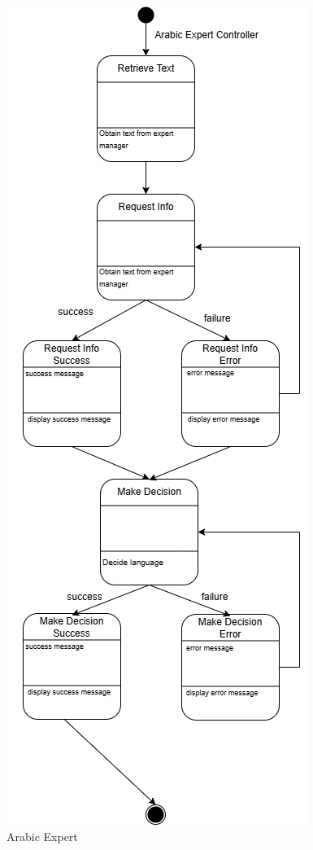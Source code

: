 \begin{figure}[H]
	\centering
	\includegraphics[width=\linewidth]{Section2/arabic_expert_state_diagram.png}
	\caption{Arabic Expert}
	\label{ArabicExpert}
\end{figure}